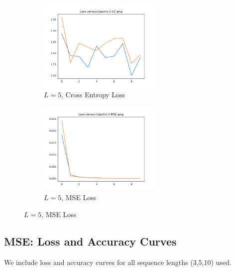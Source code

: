 \begin{figure}[!htbp]
\begin{subfigure}
\centering
\includegraphics[angle=0,width=0.65\textwidth]{assign-3/logs/Loss-5-CE-hidden-5.png}
\caption{$L=5$, Cross Entropy Loss}
\end{subfigure}
\begin{subfigure}
\centering
\includegraphics[angle=0,width=0.65\textwidth]{assign-3/logs/Loss-5-MSE-hidden-5.png}
\caption{$L=5$, MSE Loss}
\end{subfigure}
\end{figure}

\subsection{MSE: Loss and Accuracy Curves}

We include loss and accuracy curves for all sequence lengths (3,5,10) used.

